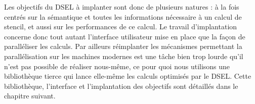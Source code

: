 Les objectifs du DSEL à implanter sont donc de plusieurs natures : à la fois centrés sur la sémantique et toutes les informations nécessaire à un calcul de stencil, et aussi sur les performances de ce calcul. Le travail d'implantation concerne donc tout autant l'interface utilisateur mise en place que la façon de paralléliser les calculs. Par ailleurs réimplanter les mécanismes permettant la parallélisation sur les machines modernes est une tâche bien trop lourde qu'il n'est pas possible de réaliser nous-même, ce pour quoi nous utilisons une bibliothèque tierce qui lance elle-même les calculs optimisés par le DSEL. Cette bibliothèque, l'interface et l'implantation des objectifs sont détaillés dans le chapitre suivant.
